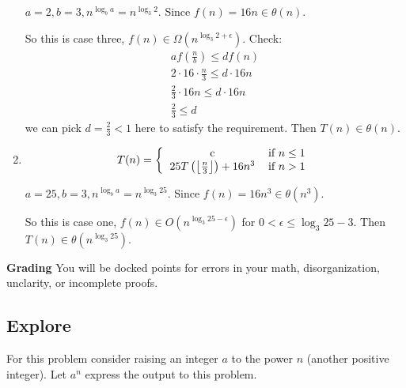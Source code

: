 \documentclass[paper=a4, fontsize=11pt]{scrartcl}
\numberwithin{equation}{section}		%
\numberwithin{figure}{section}			%
\numberwithin{table}{section}				%
\begin{document}
\begin{enumerate}
$a=2, b = 3, n^{\log_b a} = n^{\log_3 2}$. Since $f(n) = 16n \in \theta(n)$. 

So this is case three, $f(n) \in \Omega(n^{\log_3 2 + \epsilon})$. Check:
\begin{gather*}
	af(\frac{n}{b}) \leq df(n) \\
	2\cdot 16\cdot \frac{n}{3} \leq d\cdot 16n \\
	\frac{2}{3}\cdot 16n \leq d\cdot 16n \\
	\frac{2}{3} \leq d
\end{gather*}
we can pick $d = \frac{2}{3} < 1$ here to satisfy the requirement. Then $T(n) \in \theta(n)$.

\item \[
T(n) = \left\{
\begin{tabular}{cc}
c & \text{if} $n \leq 1$ \\
$25T\left(\left\lfloor\frac{n}{3}\right\rfloor\right)+16n^3$ & \text{if} $n>1$ \\
\end{tabular}\right.
\]

$a=25, b = 3, n^{\log_b a} = n^{\log_3 25}$. Since $f(n) = 16n^3 \in \theta(n^3)$. 

So this is case one, $f(n) \in O(n^{\log_3 25 - \epsilon})$ for $0 < \epsilon \leq \log_3 25 - 3$. Then $T(n) \in \theta(n^{\log_3 25})$.

\end{enumerate}
\noindent\textbf{Grading} You will be docked points for errors in your math, disorganization, unclarity, or incomplete proofs. 

\subsection{Explore}

For this problem consider raising an integer $a$ to the power $n$ (another positive integer).  Let $a^n$ express the output to this problem. 
\end{document}
